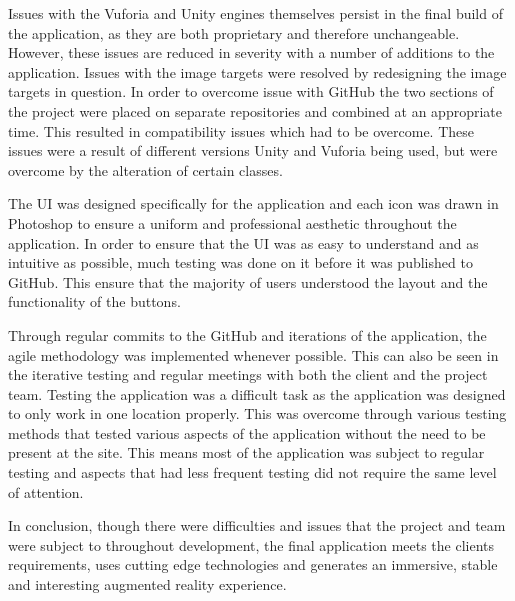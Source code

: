 Issues with the Vuforia and Unity engines themselves persist in the final build of the application, as they are both proprietary and therefore unchangeable. However, these issues are reduced in severity with a number of additions to the application. Issues with the image targets were resolved by redesigning the image targets in question. In order to overcome issue with GitHub the two sections of the project were placed on separate repositories and combined at an appropriate time. This resulted in compatibility issues which had to be overcome. These issues were a result of different versions Unity and Vuforia being used, but were overcome by the alteration of certain classes.

The UI was designed specifically for the application and each icon was drawn in Photoshop to ensure a uniform and professional aesthetic throughout the application. In order to ensure that the UI was as easy to understand and as intuitive as possible, much testing was done on it before it was published to GitHub. This ensure that the majority of users understood the layout and the functionality of the buttons.

Through regular commits to the GitHub and iterations of the application, the agile methodology was implemented whenever possible. This can also be seen in the iterative testing and regular meetings with both the client and the project team. Testing the application was a difficult task as the application was designed to only work in one location properly. This was overcome through various testing methods that tested various aspects of the application without the need to be present at the site. This means most of the application was subject to regular testing and aspects that had less frequent testing did not require the same level of attention.

In conclusion, though there were difficulties and issues that the project and team were subject to throughout development, the final application meets the clients requirements, uses cutting edge technologies and generates an immersive, stable and interesting augmented reality experience.